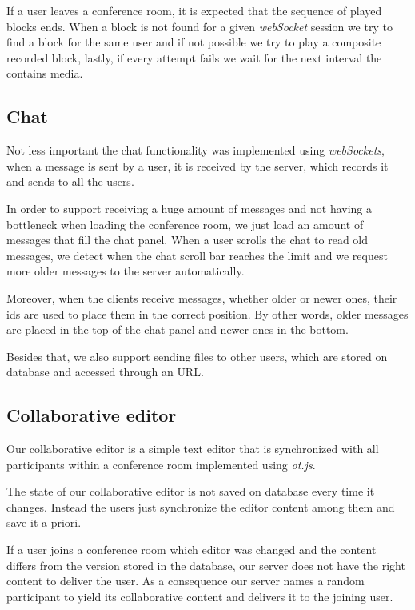 		If a user leaves a conference room, it is expected that the sequence of played blocks ends. When a block is not found for a given \emph{webSocket} session we try to find a block for the same user and if not possible we try to play a composite recorded block, lastly, if every attempt fails we wait for the next interval the contains media.

\subsection{Chat}
		Not less important the chat functionality was implemented using \emph{webSockets}, when a message is sent by a user, it is received by the server, which records it and sends to all the users.

		In order to support receiving a huge amount of messages and not having a bottleneck when loading the conference room, we just load an amount of messages that fill the chat panel. When a user scrolls the chat to read old messages, we detect when the chat scroll bar reaches the limit and we request more older messages to the server automatically.

		Moreover, when the clients receive messages, whether older or newer ones, their ids are used to place them in the correct position. By other words, older messages are placed in the top of the chat panel and newer ones in the bottom.

		Besides that, we also support sending files to other users, which are stored on database and accessed through an \ac{URL}.

\subsection{Collaborative editor}

Our collaborative editor is a simple text editor that is synchronized with all participants within a conference room implemented using \emph{ot.js}.

The state of our collaborative editor is not saved on database every time it changes. Instead the users just synchronize the editor content among them and save it a priori.

If a user joins a conference room which editor was changed and the content differs from the version stored in the database, our server does not have the right content to deliver the user. As a consequence our server names a random participant to yield its collaborative content and delivers it to the joining user.

